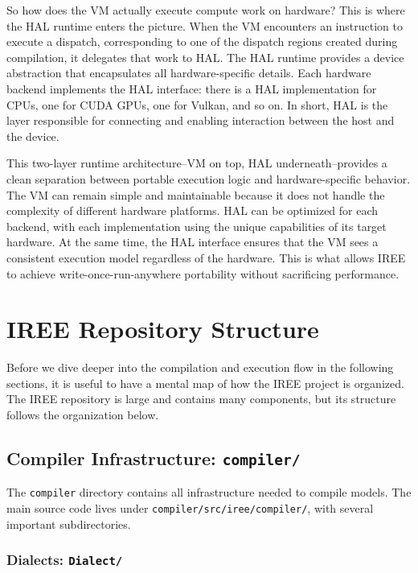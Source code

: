 \documentclass[11pt,a4paper]{article}
\begin{document}
So how does the VM actually execute compute work on hardware? This is where the HAL runtime enters the picture. When the VM encounters an instruction to execute a dispatch, corresponding to one of the dispatch regions created during compilation, it delegates that work to HAL. The HAL runtime provides a device abstraction that encapsulates all hardware-specific details. Each hardware backend implements the HAL interface: there is a HAL implementation for CPUs, one for CUDA GPUs, one for Vulkan, and so on. In short, HAL is the layer responsible for connecting and enabling interaction between the host and the device.

This two-layer runtime architecture--VM on top, HAL underneath--provides a clean separation between portable execution logic and hardware-specific behavior. The VM can remain simple and maintainable because it does not handle the complexity of different hardware platforms. HAL can be optimized for each backend, with each implementation using the unique capabilities of its target hardware. At the same time, the HAL interface ensures that the VM sees a consistent execution model regardless of the hardware. This is what allows IREE to achieve write-once-run-anywhere portability without sacrificing performance.

\section{IREE Repository Structure}

Before we dive deeper into the compilation and execution flow in the following sections, it is useful to have a mental map of how the IREE project is organized. The IREE repository is large and contains many components, but its structure follows the organization below.

\subsection{Compiler Infrastructure: \texttt{compiler/}}

The \texttt{compiler} directory contains all infrastructure needed to compile models. The main source code lives under \texttt{compiler/src/iree/compiler/}, with several important subdirectories.

\subsubsection{Dialects: \texttt{Dialect/}}
\end{document}
